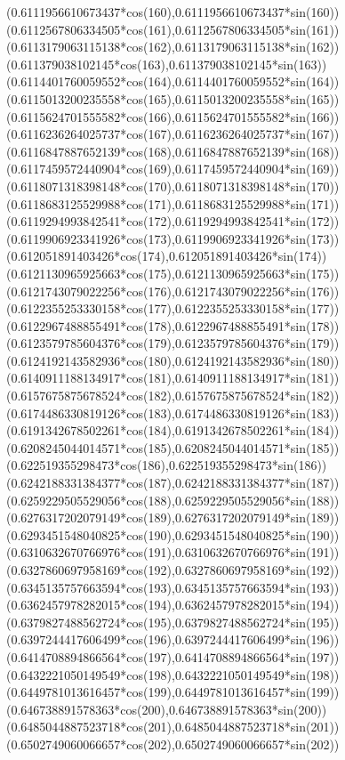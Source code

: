 {({0.6111956610673437*cos(160)},{0.6111956610673437*sin(160)})
({0.6112567806334505*cos(161)},{0.6112567806334505*sin(161)})
({0.6113179063115138*cos(162)},{0.6113179063115138*sin(162)})
({0.611379038102145*cos(163)},{0.611379038102145*sin(163)})
({0.6114401760059552*cos(164)},{0.6114401760059552*sin(164)})
({0.6115013200235558*cos(165)},{0.6115013200235558*sin(165)})
({0.6115624701555582*cos(166)},{0.6115624701555582*sin(166)})
({0.6116236264025737*cos(167)},{0.6116236264025737*sin(167)})
({0.6116847887652139*cos(168)},{0.6116847887652139*sin(168)})
({0.6117459572440904*cos(169)},{0.6117459572440904*sin(169)})
({0.6118071318398148*cos(170)},{0.6118071318398148*sin(170)})
({0.6118683125529988*cos(171)},{0.6118683125529988*sin(171)})
({0.6119294993842541*cos(172)},{0.6119294993842541*sin(172)})
({0.6119906923341926*cos(173)},{0.6119906923341926*sin(173)})
({0.612051891403426*cos(174)},{0.612051891403426*sin(174)})
({0.6121130965925663*cos(175)},{0.6121130965925663*sin(175)})
({0.6121743079022256*cos(176)},{0.6121743079022256*sin(176)})
({0.6122355253330158*cos(177)},{0.6122355253330158*sin(177)})
({0.6122967488855491*cos(178)},{0.6122967488855491*sin(178)})
({0.6123579785604376*cos(179)},{0.6123579785604376*sin(179)})
({0.6124192143582936*cos(180)},{0.6124192143582936*sin(180)})
({0.6140911188134917*cos(181)},{0.6140911188134917*sin(181)})
({0.6157675875678524*cos(182)},{0.6157675875678524*sin(182)})
({0.6174486330819126*cos(183)},{0.6174486330819126*sin(183)})
({0.6191342678502261*cos(184)},{0.6191342678502261*sin(184)})
({0.6208245044014571*cos(185)},{0.6208245044014571*sin(185)})
({0.622519355298473*cos(186)},{0.622519355298473*sin(186)})
({0.6242188331384377*cos(187)},{0.6242188331384377*sin(187)})
({0.6259229505529056*cos(188)},{0.6259229505529056*sin(188)})
({0.6276317202079149*cos(189)},{0.6276317202079149*sin(189)})
({0.6293451548040825*cos(190)},{0.6293451548040825*sin(190)})
({0.6310632670766976*cos(191)},{0.6310632670766976*sin(191)})
({0.6327860697958169*cos(192)},{0.6327860697958169*sin(192)})
({0.6345135757663594*cos(193)},{0.6345135757663594*sin(193)})
({0.6362457978282015*cos(194)},{0.6362457978282015*sin(194)})
({0.6379827488562724*cos(195)},{0.6379827488562724*sin(195)})
({0.6397244417606499*cos(196)},{0.6397244417606499*sin(196)})
({0.6414708894866564*cos(197)},{0.6414708894866564*sin(197)})
({0.6432221050149549*cos(198)},{0.6432221050149549*sin(198)})
({0.6449781013616457*cos(199)},{0.6449781013616457*sin(199)})
({0.646738891578363*cos(200)},{0.646738891578363*sin(200)})
({0.6485044887523718*cos(201)},{0.6485044887523718*sin(201)})
({0.6502749060066657*cos(202)},{0.6502749060066657*sin(202)})
}
